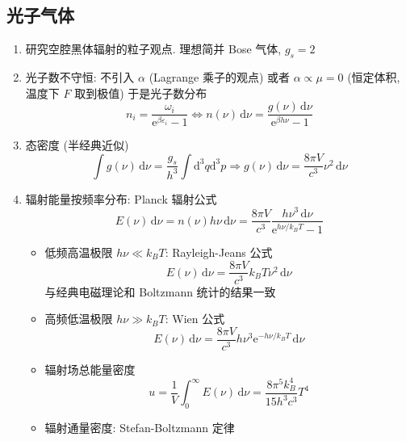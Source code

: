 \documentclass[12pt,a4paper]{article}%
\numberwithin{equation}{section}
\newcommand{\dif}{\mathrm{d}}
\newcommand{\diff}{\,\mathrm{d}}
\newcommand\e{\mathrm{e}}%
\begin{document}
\subsection{光子气体} %
\label{sub:photon_gas}
\begin{enumerate}
    \item 研究空腔黑体辐射的粒子观点. 理想简并 Bose 气体, $g_s = 2$
    \item 光子数不守恒: 不引入 $\alpha$ (Lagrange 乘子的观点) 
    或者 $\alpha\propto\mu = 0$ (恒定体积, 温度下 $F$ 取到极值) 
    于是光子数分布
    \begin{equation}
        n_i = \frac{\omega_i}{\e^{\beta\varepsilon_i} - 1} \Leftrightarrow
        n(\nu)\diff\nu = \frac{g(\nu)\diff\nu}{\e^{\beta h\nu} - 1}
    \end{equation}
    \item 态密度 (半经典近似)
    \begin{equation}
        \int g(\nu)\diff\nu = \frac{g_s}{h^3}\int\dif^3q\dif^3p 
        \Rightarrow g(\nu)\diff\nu = \frac{8\pi V}{c^3}\nu^2\diff\nu
    \end{equation}
    \item 辐射能量按频率分布: Planck 辐射公式
    \begin{equation}
        E(\nu)\diff\nu = n(\nu) h\nu\diff\nu 
        = \frac{8\pi V}{c^3}\frac{h\nu^3\diff\nu}{\e^{h\nu/k_BT} - 1}
    \end{equation}
    \begin{itemize}
        \item 低频高温极限 $h\nu\ll k_BT$: Rayleigh-Jeans 公式
        \begin{equation}
            E(\nu)\diff\nu =\frac{8\pi V}{c^3}k_BT\nu^2\diff\nu
        \end{equation}
        与经典电磁理论和 Boltzmann 统计的结果一致
        \item 高频低温极限 $h\nu\gg k_BT$: Wien 公式
        \begin{equation}
            E(\nu)\diff\nu = \frac{8\pi V}{c^3}h\nu^3\e^{-h\nu/k_BT}\diff\nu
        \end{equation}
        \item 辐射场总能量密度
        \begin{equation}\label{equ:photon_totE}
            u = \frac 1V\int_0^\infty E(\nu)\diff\nu 
            = \frac{8\pi^5k_B^4}{15h^3c^3}T^4
        \end{equation}
        \item 辐射通量密度: Stefan-Boltzmann 定律
        \begin{equation}

\end{equation}
\end{itemize}
\end{enumerate}
\end{document}
